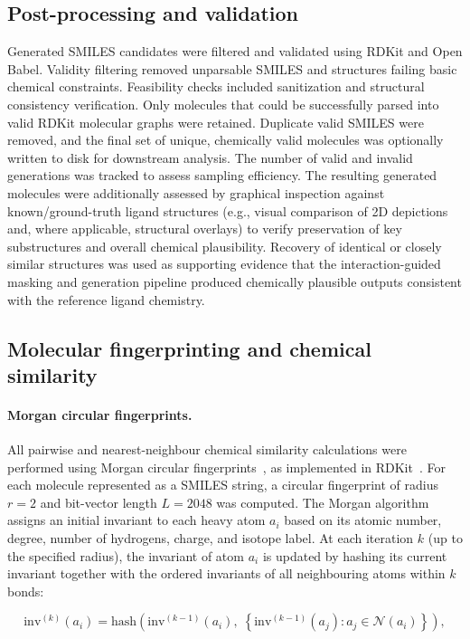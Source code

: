 \documentclass[a4paper,12pt]{article}
\begin{document}
\subsection{Post-processing and validation}
Generated SMILES candidates were filtered and validated using RDKit and Open Babel. Validity filtering removed unparsable SMILES and structures failing basic chemical constraints. Feasibility checks included sanitization and structural consistency verification. Only molecules that could be successfully parsed into valid RDKit molecular graphs were retained. Duplicate valid SMILES were removed, and the final set of unique, chemically valid molecules was optionally written to disk for downstream analysis. The number of valid and invalid generations was tracked to assess sampling efficiency.
The resulting generated molecules were additionally assessed by graphical inspection against known/ground-truth ligand structures (e.g., visual comparison of 2D depictions and, where applicable, structural overlays) to verify preservation of key substructures and overall chemical plausibility. Recovery of identical or closely similar structures was used as supporting evidence that the interaction-guided masking and generation pipeline produced chemically plausible outputs consistent with the reference ligand chemistry.
 
\subsection{Molecular fingerprinting and chemical similarity}
 
\paragraph{Morgan circular fingerprints.}
All pairwise and nearest-neighbour chemical similarity calculations
were performed using Morgan circular fingerprints~\cite{morgan1965},
as implemented in RDKit~\cite{rdkit}.
For each molecule represented as a SMILES string, a circular
fingerprint of radius $r = 2$ and bit-vector length $L = 2048$ was
computed.
The Morgan algorithm assigns an initial invariant to each heavy
atom $a_i$ based on its atomic number, degree, number of hydrogens,
charge, and isotope label.
At each iteration $k$ (up to the specified radius), the invariant
of atom $a_i$ is updated by hashing its current invariant together
with the ordered invariants of all neighbouring atoms within $k$
bonds:
 
\begin{equation}
    \text{inv}^{(k)}(a_i) =
        \text{hash}\!\left(
            \text{inv}^{(k-1)}(a_i),\;
            \left\{
                \text{inv}^{(k-1)}(a_j) : a_j \in \mathcal{N}(a_i)
            \right\}
        \right),
    \label{eq:morgan_update}
\end{equation}
 
\end{document}
